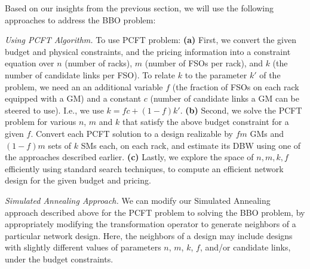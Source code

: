 Based on our insights from the previous section, we will use the
following approaches to address the BBO problem:

\squishlist
\item
{\em Using PCFT Algorithm.}  To use PCFT problem: {\bf (a)} First, we
convert the given budget and physical constraints, and the pricing
information into a constraint equation over $n$ (number of racks), $m$
(number of FSOs per rack), and $k$ (the number of candidate links per
FSO). To relate $k$ to the parameter $k'$ of the problem, we need an
an additional variable $f$ (the fraction of FSOs on each rack equipped
with a GM) and a constant $c$ (number of candidate links a GM can be
steered to use). I.e., we use $k = fc + (1-f)k'$.
%
{\bf (b)} Second, we solve the PCFT problem for various $n$, $m$ and $k$
that satisfy the above budget constraint for a given $f$. Convert each
PCFT solution to a design realizable by $fm$ GMs and $(1-f)m$ sets of
$k$ SMs each, on each rack, and estimate its DBW using one of the
approaches described earlier. {\bf (c)} Lastly, we explore the space of
$n,m,k,f$ efficiently using standard search techniques, to compute an
efficient network design for the given budget and pricing.

\item
{\em Simulated Annealing Approach.}  We can modify our Simulated
Annealing approach described above for the PCFT problem to solving the
BBO problem, by appropriately modifying the transformation operator to
generate neighbors of a particular network design. Here, the neighbors
of a design may include designs with slightly different values of
parameters $n$, $m$, $k$, $f$, and/or candidate links, under the
budget constraints.  
\squishend

